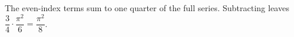 The even-index terms sum to one quarter of the full series. Subtracting leaves $\dfrac{3}{4}\cdot\dfrac{\pi^2}{6}=\boxed{\dfrac{\pi^2}{8}}$.

